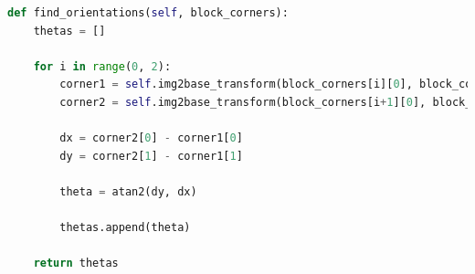 \begin{lstlisting}[caption=Funktion til at finde orientering på en klods., label=orientation, language=Python]
def find_orientations(self, block_corners):
    thetas = []

    for i in range(0, 2):
        corner1 = self.img2base_transform(block_corners[i][0], block_corners[i][1])
        corner2 = self.img2base_transform(block_corners[i+1][0], block_corners[i+1][1])

        dx = corner2[0] - corner1[0]
        dy = corner2[1] - corner1[1]

        theta = atan2(dy, dx)

        thetas.append(theta)

    return thetas
\end{lstlisting}

